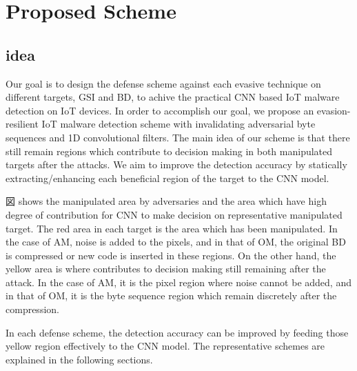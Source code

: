 \chapter{Proposed Scheme}\label{sec:proposed_scheme}

\section{idea}
Our goal is to design the defense scheme against each evasive technique on different targets, GSI and BD, to achive the practical CNN based IoT malware detection on IoT devices.
In order to accomplish our goal, we propose an evasion-resilient IoT malware detection scheme with invalidating adversarial byte sequences and 1D convolutional filters.  
The main idea of our scheme is that there still remain regions which contribute to decision making in both manipulated targets after the attacks.
We aim to improve the detection accuracy by statically extracting/enhancing each beneficial region of the target to the CNN model.

図 shows the manipulated area by adversaries and the area which have high degree of contribution for CNN to make decision on representative manipulated target.
The red area in each target is the area which has been manipulated.
In the case of AM, noise is added to the pixels, and in that of OM, the original BD is compressed or new code is inserted in these regions.
On the other hand, the yellow area is where contributes to decision making still remaining after the attack.
In the case of AM, it is the pixel region where noise cannot be added, and in that of OM, it is the byte sequence region which remain discretely after the compression.

In each defense scheme, the detection accuracy can be improved by feeding those yellow region effectively to the CNN model.
The representative schemes are explained in the following sections.



